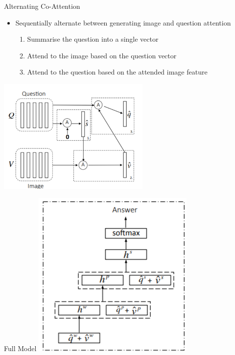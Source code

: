 \documentclass{beamer}
\begin{document}
\begin{frame}{Alternating Co-Attention}
\begin{itemize}
    \item Sequentially alternate between generating image and question attention
    \begin{enumerate}
        \item Summarise the question into a single vector
        \item Attend to the image based on the question vector
        \item Attend to the question based on the attended image feature
    \end{enumerate}
\end{itemize}

\includegraphics[width=7.5cm]{Annotation 2020-02-10 111002.png}

\end{frame}

\begin{frame}{Full Model}
\includegraphics[]{Annotation 2020-02-10 113904.png}
\end{frame}
\end{document}
